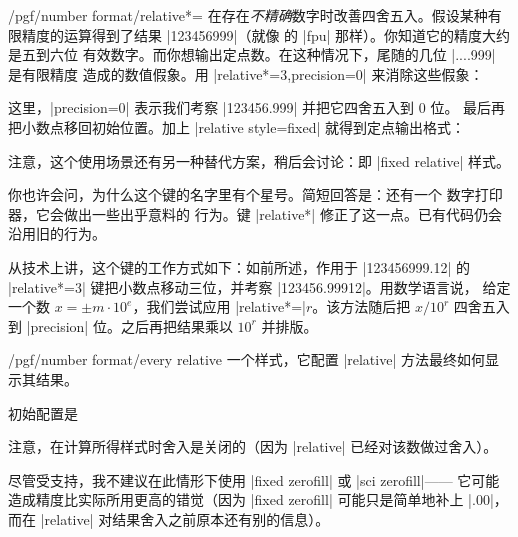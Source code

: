 \documentclass[a4paper,doc2]{ltxdoc}
\begin{document}
\begin{keylist}{/pgf/number format/relative*=}
    在存在\emph{不精确}数字时改善四舍五入。假设某种有限精度的运算得到了结果
    |123456999|（就像 \pgfname 的 |fpu| 那样）。你知道它的精度大约是五到六位
    有效数字。而你想输出定点数。在这种情况下，尾随的几位 |....999| 是有限精度
    造成的数值假象。用 |relative*=3,precision=0| 来消除这些假象：
\begin{codeexample}[]
\hspace{1em}
\end{codeexample}
    \noindent 这里，|precision=0| 表示我们考察 |123456.999| 并把它四舍五入到 $0$ 位。
    最后再把小数点移回初始位置。加上 |relative style=fixed| 就得到定点输出格式：
\begin{codeexample}[]
\hspace{1em}
\end{codeexample}
    \noindent 注意，这个使用场景还有另一种替代方案，稍后会讨论：即 |fixed relative| 样式。
\begin{codeexample}[]
\hspace{1em}
\end{codeexample}

    你也许会问，为什么这个键的名字里有个星号。简短回答是：还有一个
     数字打印器，它会做出一些出乎意料的
    行为。键 |relative*| 修正了这一点。已有代码仍会沿用旧的行为。

    从技术上讲，这个键的工作方式如下：如前所述，作用于 |123456999.12| 的
    |relative*=3| 键把小数点移动三位，并考察 |123456.99912|。用数学语言说，
    给定一个数 $x = \pm m \cdot 10^e$，我们尝试应用 |relative*=|$r$。该方法随后把
    $x / 10^r$ 四舍五入到 |precision| 位。之后再把结果乘以 $10^r$ 并排版。
\end{keylist}

\begin{stylekey}{/pgf/number format/every relative}
    一个样式，它配置 |relative| 方法最终如何显示其结果。

    初始配置是
\begin{codeexample}
\end{codeexample}

    注意，在计算所得样式时舍入是关闭的（因为 |relative| 已经对该数做过舍入）。

    尽管受支持，我不建议在此情形下使用 |fixed zerofill| 或 |sci zerofill|——
    它可能造成精度比实际所用更高的错觉（因为 |fixed zerofill| 可能只是简单地补上
    |.00|，而在 |relative| 对结果舍入之前原本还有别的信息）。
\end{stylekey}
\end{document}
